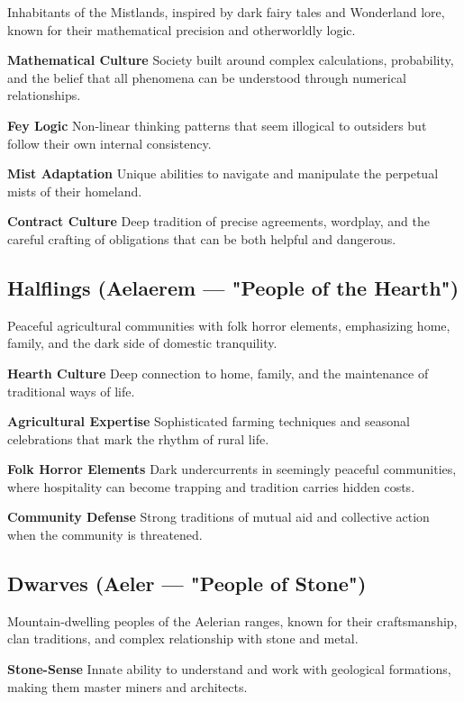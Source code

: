 \documentclass[11pt,twoside,openany]{book}
\begin{document}
Inhabitants of the Mistlands, inspired by dark fairy tales and Wonderland lore, known for their mathematical precision and otherworldly logic.

\textbf{Mathematical Culture} Society built around complex calculations, probability, and the belief that all phenomena can be understood through numerical relationships.

\textbf{Fey Logic} Non-linear thinking patterns that seem illogical to outsiders but follow their own internal consistency.

\textbf{Mist Adaptation} Unique abilities to navigate and manipulate the perpetual mists of their homeland.

\textbf{Contract Culture} Deep tradition of precise agreements, wordplay, and the careful crafting of obligations that can be both helpful and dangerous.

\subsection*{Halflings (Aelaerem — "People of the Hearth")}

Peaceful agricultural communities with folk horror elements, emphasizing home, family, and the dark side of domestic tranquility.

\textbf{Hearth Culture} Deep connection to home, family, and the maintenance of traditional ways of life.

\textbf{Agricultural Expertise} Sophisticated farming techniques and seasonal celebrations that mark the rhythm of rural life.

\textbf{Folk Horror Elements} Dark undercurrents in seemingly peaceful communities, where hospitality can become trapping and tradition carries hidden costs.

\textbf{Community Defense} Strong traditions of mutual aid and collective action when the community is threatened.

\subsection*{Dwarves (Aeler — "People of Stone")}

Mountain-dwelling peoples of the Aelerian ranges, known for their craftsmanship, clan traditions, and complex relationship with stone and metal.

\textbf{Stone-Sense} Innate ability to understand and work with geological formations, making them master miners and architects.
\end{document}

